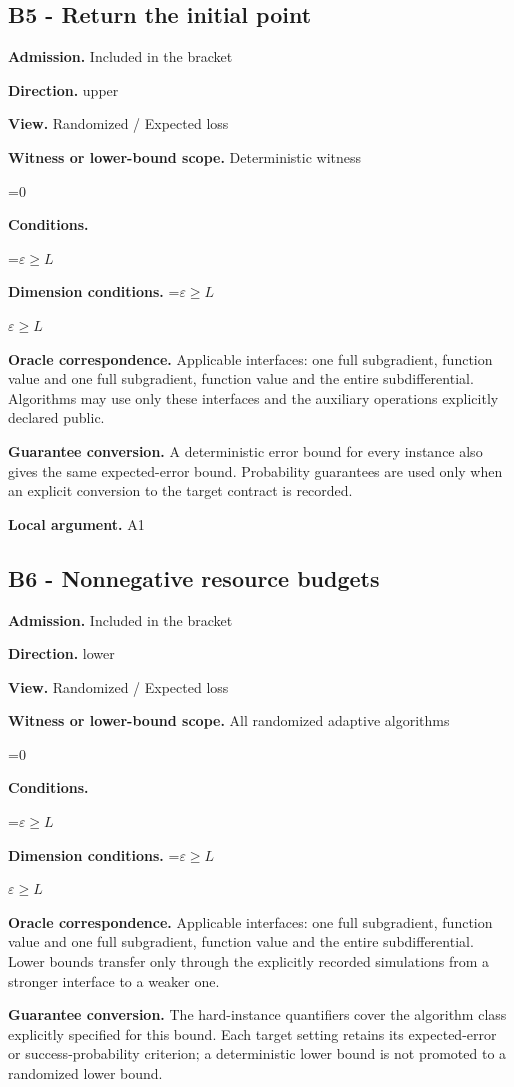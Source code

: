\documentclass[10pt,a4paper]{article}
\newcommand{\AtlasMath}[1]{\par\begingroup\centering\setbox0=\hbox{$\displaystyle #1$}\ifdim\wd0>1.4\linewidth\typeout{ATLAS WIDE FORMULA: \the\wd0}\fi\ifdim\wd0>\linewidth\resizebox{\linewidth}{!}{\box0}\else\box0\fi\par\endgroup}
\newcommand{\AtlasInlineMath}[1]{\begingroup\setbox0=\hbox{$#1$}\ifdim\wd0>.4\linewidth\endgroup\AtlasMath{#1}\else\endgroup$#1$\fi}
\begin{document}
\subsection{B5 - Return the initial point}
\textbf{Admission.} Included in the bracket

\textbf{Direction.} upper

\textbf{View.} Randomized / Expected loss

\textbf{Witness or lower-bound scope.} Deterministic witness

\AtlasMath{0}
\textbf{Conditions.} 
\AtlasMath{\varepsilon\ge L}


\textbf{Dimension conditions.} \AtlasInlineMath{\varepsilon\ge L}

\textbf{Oracle correspondence.} Applicable interfaces: one full subgradient, function value and one full subgradient, function value and the entire subdifferential. Algorithms may use only these interfaces and the auxiliary operations explicitly declared public.

\textbf{Guarantee conversion.} A deterministic error bound for every instance also gives the same expected-error bound. Probability guarantees are used only when an explicit conversion to the target contract is recorded.

\textbf{Local argument.} A1

\subsection{B6 - Nonnegative resource budgets}
\textbf{Admission.} Included in the bracket

\textbf{Direction.} lower

\textbf{View.} Randomized / Expected loss

\textbf{Witness or lower-bound scope.} All randomized adaptive algorithms

\AtlasMath{0}
\textbf{Conditions.} 
\AtlasMath{\varepsilon\ge L}


\textbf{Dimension conditions.} \AtlasInlineMath{\varepsilon\ge L}

\textbf{Oracle correspondence.} Applicable interfaces: one full subgradient, function value and one full subgradient, function value and the entire subdifferential. Lower bounds transfer only through the explicitly recorded simulations from a stronger interface to a weaker one.

\textbf{Guarantee conversion.} The hard-instance quantifiers cover the algorithm class explicitly specified for this bound. Each target setting retains its expected-error or success-probability criterion; a deterministic lower bound is not promoted to a randomized lower bound.
\end{document}

